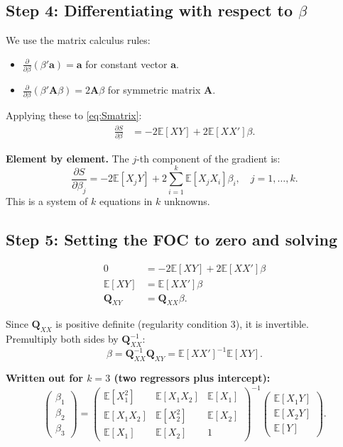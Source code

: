 \documentclass[12pt]{article}
\newcommand{\E}{\mathbb{E}}
\newcommand{\bfQ}{\mathbf{Q}}
\theoremstyle{definition}
\begin{document}
\subsection{Step 4: Differentiating with respect to $\beta$}

We use the matrix calculus rules:
\begin{itemize}
\item $\frac{\partial}{\partial \beta}(\beta' \mathbf{a}) = \mathbf{a}$ \quad for constant vector $\mathbf{a}$.
\item $\frac{\partial}{\partial \beta}(\beta' \mathbf{A} \beta) = 2\mathbf{A}\beta$ \quad for symmetric matrix $\mathbf{A}$.
\end{itemize}

Applying these to \eqref{eq:Smatrix}:
\begin{align*}
\frac{\partial S}{\partial \beta} &= -2\E[XY] + 2\E[XX']\beta.
\end{align*}

\textbf{Element by element.}  The $j$-th component of the gradient is:
\[
\frac{\partial S}{\partial \beta_j} = -2\E[X_j Y] + 2\sum_{i=1}^{k} \E[X_j X_i]\beta_i, \quad j = 1, \ldots, k.
\]
This is a system of $k$ equations in $k$ unknowns.

\subsection{Step 5: Setting the FOC to zero and solving}

\begin{align}
0 &= -2\E[XY] + 2\E[XX']\beta \nonumber\\
\E[XY] &= \E[XX']\beta \nonumber\\
\bfQ_{XY} &= \bfQ_{XX}\beta. \label{eq:normalQ}
\end{align}

Since $\bfQ_{XX}$ is positive definite (regularity condition 3), it is invertible. Premultiply both sides by $\bfQ_{XX}^{-1}$:
\begin{equation}
\boxed{\beta = \bfQ_{XX}^{-1}\bfQ_{XY} = \E[XX']^{-1}\E[XY].} \label{eq:betastar}
\end{equation}

\textbf{Written out for $k=3$ (two regressors plus intercept):}
\[
\begin{pmatrix} \beta_1 \\ \beta_2 \\ \beta_3 \end{pmatrix}
=
\begin{pmatrix}
\E[X_1^2] & \E[X_1 X_2] & \E[X_1] \\
\E[X_1 X_2] & \E[X_2^2] & \E[X_2] \\
\E[X_1] & \E[X_2] & 1
\end{pmatrix}^{-1}
\begin{pmatrix}
\E[X_1 Y] \\
\E[X_2 Y] \\
\E[Y]
\end{pmatrix}.
\]
\end{document}
